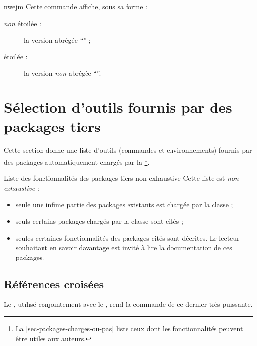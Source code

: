 \begin{docCommand}{nwejm}{}
  Cette commande affiche, sous sa forme :
  \begin{description}
  \item[\emph{non} étoilée :] la version abrégée \enquote{\nwejm} ;
  \item[étoilée :] la version \emph{non} abrégée \enquote{\nwejm*}.
  \end{description}
\end{docCommand}

\section{Sélection d'outils fournis par des packages tiers}

Cette section donne une liste d'outils (commandes et environnements) fournis par
des packages automatiquement chargés par la \nwejmauthorcl\footnote{La
  \vref{sec-packages-charges-ou-pas} liste ceux dont les fonctionnalités peuvent
  être utiles aux auteurs.}.

\begin{dbwarning}{Liste des fonctionnalités des packages tiers non exhaustive}{}
  Cette liste est \emph{non exhaustive} :
  \begin{itemize}
  \item seule une infime partie des packages existants est chargée par la
    classe ;
  \item seuls certains packages chargés par la classe sont cités ;
  \item seules certaines fonctionnalités des packages cités sont décrites. Le
    lecteur souhaitant en savoir davantage est invité à lire la documentation de
    ces packages.
  \end{itemize}
\end{dbwarning}

\subsection{Références croisées}
\label{sec-references-croisees}

Le , utilisé conjointement avec le , rend la
commande  de ce dernier très puissante.

